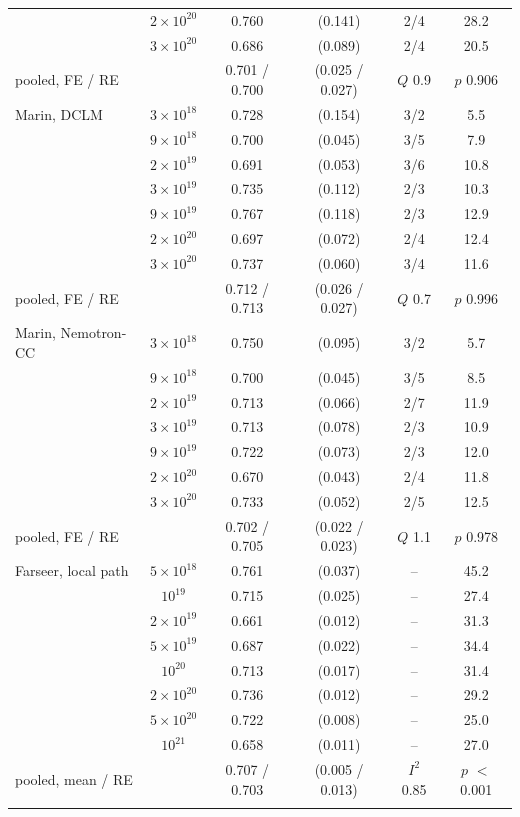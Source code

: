 \begin{table}[tp]
\begin{tabular*}{\textwidth}{@{\extracolsep{\fill}}>{\raggedright\arraybackslash}p{}ccccc@{}}
 & $2\times10^{20}$ & 0.760 & (0.141) & 2/4 & 28.2 \\
 & $3\times10^{20}$ & 0.686 & (0.089) & 2/4 & 20.5 \\
\quad pooled, FE / RE & & 0.701 / 0.700 & (0.025 / 0.027) & $Q$ 0.9 & $p$ 0.906 \\
\addlinespace
Marin, DCLM & $3\times10^{18}$ & 0.728 & (0.154) & 3/2 & 5.5 \\
 & $9\times10^{18}$ & 0.700 & (0.045) & 3/5 & 7.9 \\
 & $2\times10^{19}$ & 0.691 & (0.053) & 3/6 & 10.8 \\
 & $3\times10^{19}$ & 0.735 & (0.112) & 2/3 & 10.3 \\
 & $9\times10^{19}$ & 0.767 & (0.118) & 2/3 & 12.9 \\
 & $2\times10^{20}$ & 0.697 & (0.072) & 2/4 & 12.4 \\
 & $3\times10^{20}$ & 0.737 & (0.060) & 3/4 & 11.6 \\
\quad pooled, FE / RE & & 0.712 / 0.713 & (0.026 / 0.027) & $Q$ 0.7 & $p$ 0.996 \\
\addlinespace
Marin, Nemotron-CC & $3\times10^{18}$ & 0.750 & (0.095) & 3/2 & 5.7 \\
 & $9\times10^{18}$ & 0.700 & (0.045) & 3/5 & 8.5 \\
 & $2\times10^{19}$ & 0.713 & (0.066) & 2/7 & 11.9 \\
 & $3\times10^{19}$ & 0.713 & (0.078) & 2/3 & 10.9 \\
 & $9\times10^{19}$ & 0.722 & (0.073) & 2/3 & 12.0 \\
 & $2\times10^{20}$ & 0.670 & (0.043) & 2/4 & 11.8 \\
 & $3\times10^{20}$ & 0.733 & (0.052) & 2/5 & 12.5 \\
\quad pooled, FE / RE & & 0.702 / 0.705 & (0.022 / 0.023) & $Q$ 1.1 & $p$ 0.978 \\
\addlinespace
Farseer, local path & $5\times10^{18}$ & 0.761 & (0.037) & -- & 45.2 \\
 & $10^{19}$ & 0.715 & (0.025) & -- & 27.4 \\
 & $2\times10^{19}$ & 0.661 & (0.012) & -- & 31.3 \\
 & $5\times10^{19}$ & 0.687 & (0.022) & -- & 34.4 \\
 & $10^{20}$ & 0.713 & (0.017) & -- & 31.4 \\
 & $2\times10^{20}$ & 0.736 & (0.012) & -- & 29.2 \\
 & $5\times10^{20}$ & 0.722 & (0.008) & -- & 25.0 \\
 & $10^{21}$ & 0.658 & (0.011) & -- & 27.0 \\
\quad pooled, mean / RE & & 0.707 / 0.703 & (0.005 / 0.013) & $I^2$ 0.85 & $p$ $<$0.001 \\
\addlinespace
\bottomrule
\end{tabular*}


\end{table}
